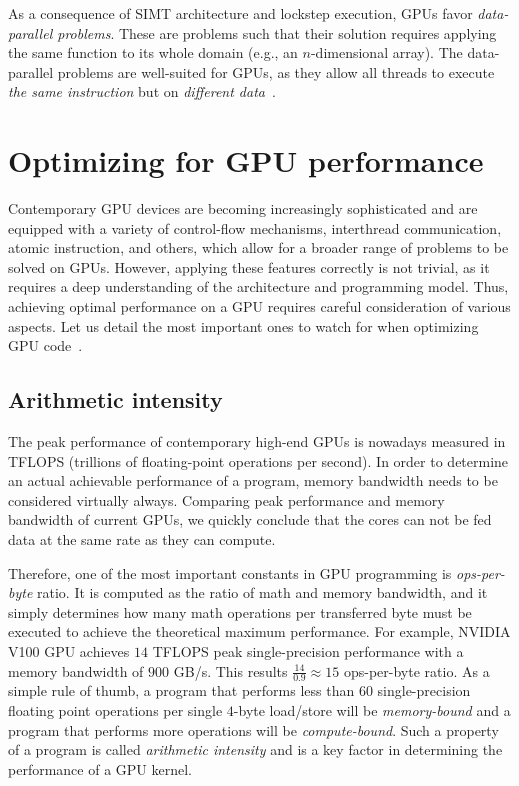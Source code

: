 As a consequence of SIMT architecture and lockstep execution, GPUs favor \emph{data-parallel problems}. These are problems such that their solution requires applying the same function to its whole domain (e.g., an $n$-dimensional array). The data-parallel problems are well-suited for GPUs, as they allow all threads to execute \emph{the same instruction} but on \emph{different data}~\cite{navarro2014survey}.

\section{Optimizing for GPU performance}
\label{sec:gpu_optim}

Contemporary GPU devices are becoming increasingly sophisticated and are equipped with a variety of control-flow mechanisms, interthread communication, atomic instruction, and others, which allow for a broader range of problems to be solved on GPUs. However, applying these features correctly is not trivial, as it requires a deep understanding of the architecture and programming model. Thus, achieving optimal performance on a GPU requires careful consideration of various aspects. Let us detail the most important ones to watch for when optimizing GPU code~\cite{pratx2011gpu}.

\subsection{Arithmetic intensity}
\label{sec:arithmetic_int}

The peak performance of contemporary high-end GPUs is nowadays measured in TFLOPS (trillions of floating-point operations per second). In order to determine an actual achievable performance of a program, memory bandwidth needs to be considered virtually always. Comparing peak performance and memory bandwidth of current GPUs, we quickly conclude that the cores can not be fed data at the same rate as they can compute.

Therefore, one of the most important constants in GPU programming is \emph{ops-per-byte} ratio. It is computed as the ratio of math and memory bandwidth, and it simply determines how many math operations per transferred byte must be executed to achieve the theoretical maximum performance. For example, NVIDIA V100 GPU achieves $14$ TFLOPS peak single-precision performance with a memory bandwidth of $900$ GB/s. This results $\frac{14}{0.9} \approx 15$ ops-per-byte ratio. As a simple rule of thumb, a program that performs less than $60$ single-precision floating point operations per single $4$-byte load/store will be \emph{memory-bound} and a program that performs more operations will be \emph{compute-bound}. Such a property of a program is called \emph{arithmetic intensity} and is a key factor in determining the performance of a GPU kernel.

